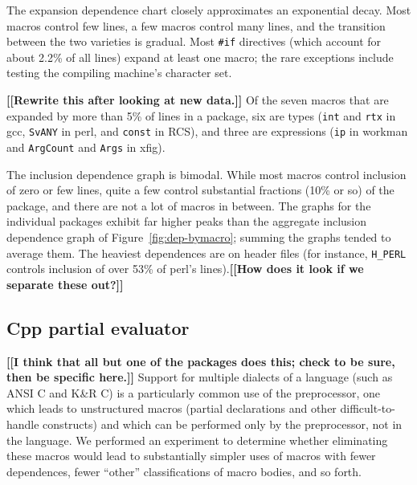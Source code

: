 \documentclass[10pt]{article}
\newcommand{\comment}[1]{\textbf{[[#1]]}}
\newcommand{\pkg}[1]{\textsf{#1}}
\begin{document}

The expansion dependence chart closely approximates an exponential decay.
Most macros control few lines, a few macros control many lines, and the
transition between the two varieties is gradual.  Most {\tt \#if}
directives (which account for about 2.2\% of all lines) expand at least one
macro; the rare exceptions include testing the compiling machine's
character set.

\comment{Rewrite this after looking at new data.}
Of the seven macros that are expanded by more than 5\% of lines in a package,
six are types ({\tt int} and {\tt rtx} in \pkg{gcc}, {\tt SvANY} in \pkg{perl}, and {\tt const} in
RCS), and three are expressions
({\tt ip} in \pkg{workman} and {\tt ArgCount} and {\tt Args} in
\pkg{xfig}).

% 
% 



The inclusion dependence graph is bimodal.  While most macros control
inclusion of zero or few lines, quite a few control substantial
fractions (10\% or so) of the package, and there are not a lot of macros in
between.  The graphs for the individual packages exhibit far higher peaks
than the aggregate inclusion dependence graph of
Figure~\ref{fig:dep-bymacro}; summing the graphs tended to average them.
The heaviest dependences are on header files (for instance, \verb|H_PERL|
controls inclusion of over 53\% of \pkg{perl}'s lines).\comment{How does
it look if we separate these out?}



\subsection{Cpp partial evaluator}

\comment{I think that all but one of the packages does this; check to be
  sure, then be specific here.}
Support for multiple dialects of a language (such as ANSI C and K\&R C) is a particularly common use of
the preprocessor, one which leads to unstructured macros (partial
declarations and other difficult-to-handle constructs) and which can be
performed only by the preprocessor, not in the language.  We performed an
experiment to determine whether eliminating these macros would lead to
substantially simpler uses of macros with fewer dependences, fewer ``other''
classifications of macro bodies, and so forth.
\end{document}
